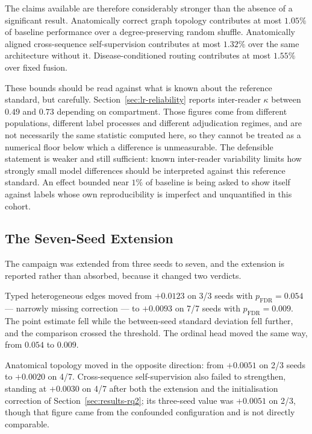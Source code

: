 \documentclass[12pt,a4paper]{report}
\begin{document}
The claims available are therefore considerably stronger than the absence of a
significant result. Anatomically correct graph topology contributes at most
$1.05\%$ of baseline performance over a degree-preserving random shuffle.
Anatomically aligned cross-sequence self-supervision contributes at most
$1.32\%$ over the same architecture without it. Disease-conditioned routing
contributes at most $1.55\%$ over fixed fusion.

\label{sec:results-nulls-caveat}
These bounds should be read against what is known about the reference
standard, but carefully. Section~\ref{sec:lr-reliability} reports inter-reader
$\kappa$ between $0.49$ and $0.73$ depending on compartment. Those figures come
from different populations, different label processes and different adjudication
regimes, and are not necessarily the same statistic computed here, so they cannot
be treated as a numerical floor below which a difference is unmeasurable. The
defensible statement is weaker and still sufficient: known inter-reader
variability limits how strongly small model differences should be interpreted
against this reference standard. An effect bounded near $1\%$ of baseline is
being asked to show itself against labels whose own reproducibility is
imperfect and unquantified in this cohort.

\subsection{The Seven-Seed Extension}
\label{sec:results-sevenseed}

The campaign was extended from three seeds to seven, and the extension is
reported rather than absorbed, because it changed two verdicts.

Typed heterogeneous edges moved from $+0.0123$ on 3/3 seeds with
$p_{\mathrm{FDR}} = 0.054$ --- narrowly missing correction --- to $+0.0093$ on
7/7 seeds with $p_{\mathrm{FDR}} = 0.009$. The point estimate fell while the
between-seed standard deviation fell further, and the comparison crossed the
threshold. The ordinal head moved the same way, from $0.054$ to $0.009$.

Anatomical topology moved in the opposite direction: from $+0.0051$ on 2/3
seeds to $+0.0020$ on 4/7. Cross-sequence self-supervision also failed to
strengthen, standing at $+0.0030$ on 4/7 after both the extension and the
initialisation correction of Section~\ref{sec:results-rq2}; its three-seed value
was $+0.0051$ on 2/3, though that figure came from the confounded configuration
and is not directly comparable.
\end{document}
